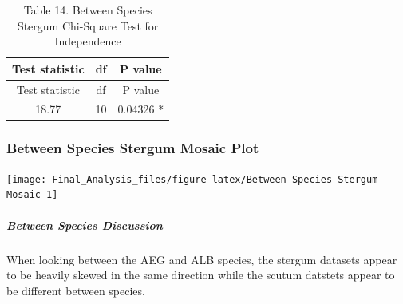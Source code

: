 \begin{longtable}[]{@{}ccc@{}}
\caption{Table 14. Between Species Stergum Chi-Square Test for
Independence}\tabularnewline
\toprule
\begin{minipage}[b]{0.22\columnwidth}\centering\strut
Test statistic\strut
\end{minipage} & \begin{minipage}[b]{0.06\columnwidth}\centering\strut
df\strut
\end{minipage} & \begin{minipage}[b]{0.14\columnwidth}\centering\strut
P value\strut
\end{minipage}\tabularnewline
\midrule
\endfirsthead
\toprule
\begin{minipage}[b]{0.22\columnwidth}\centering\strut
Test statistic\strut
\end{minipage} & \begin{minipage}[b]{0.06\columnwidth}\centering\strut
df\strut
\end{minipage} & \begin{minipage}[b]{0.14\columnwidth}\centering\strut
P value\strut
\end{minipage}\tabularnewline
\midrule
\endhead
\begin{minipage}[t]{0.22\columnwidth}\centering\strut
18.77\strut
\end{minipage} & \begin{minipage}[t]{0.06\columnwidth}\centering\strut
10\strut
\end{minipage} & \begin{minipage}[t]{0.14\columnwidth}\centering\strut
0.04326 *\strut
\end{minipage}\tabularnewline
\bottomrule
\end{longtable}

\subsubsection{Between Species Stergum Mosaic
Plot}\label{between-species-stergum-mosaic-plot}

\begin{Shaded}
\begin{Highlighting}[]
 \NormalTok{)}
\end{Highlighting}
\end{Shaded}

\begin{center}\texttt{[image: Final\_Analysis\_files/figure-latex/Between Species Stergum Mosaic-1]} \end{center}

\subparagraph{Between Species
Discussion}\label{between-species-discussion}

When looking between the AEG and ALB species, the stergum datasets
appear to be heavily skewed in the same direction while the scutum
datstets appear to be different between species.
